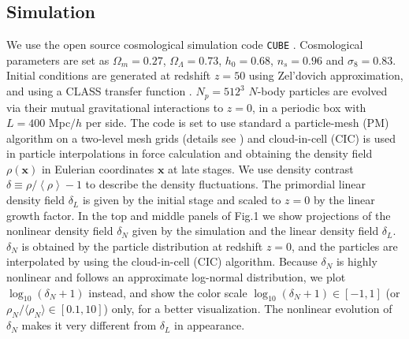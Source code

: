 \documentclass[aps,prd,twocolumn,superscriptaddress,amsfont,amssymb,amsmath,nofootinbib,showpacs,balancelastpage]{revtex4-1}
\newcommand{\bs}{\boldsymbol}
\newcommand{\lb}{\left\langle}
\newcommand{\rb}{\right\rangle}
\begin{document}
\subsection{Simulation}\label{ss.sim}
We use the open source cosmological simulation code {\tt CUBE} %
\citep{cafcube}.
Cosmological parameters are set as
$\Omega_m=0.27$, $\Omega_\Lambda=0.73$, $h_0=0.68$, $n_s=0.96$ and $\sigma_8=0.83$.
Initial conditions are generated at redshift $z=50$ 
using Zel'dovich approximation, and using a CLASS transfer function
\citep{2011JCAP...07..034B}.
$N_p=512^3$ $N$-body particles are evolved via 
their mutual gravitational interactions to $z=0$, in a periodic box with $L=400$ 
Mpc$/h$ per side. The code is set to use standard a particle-mesh (PM) algorithm 
\cite{1988csup.book.....H} on a two-level mesh grids
(details see \cite{2013MNRAS.436..540H}) and cloud-in-cell
(CIC) is used in particle interpolations in force 
calculation and obtaining the density field $\rho({\bs x})$ in Eulerian coordinates 
${\bs x}$ at late stages. We use density contrast $\delta\equiv\rho/\lb\rho\rb-1$ 
to describe the density fluctuations. The primordial linear density field $
\delta_L$ is given by the initial stage and scaled to $z=0$ by the linear growth 
factor. In the top and middle panels of Fig.1 we show projections of the nonlinear density field
$\delta_N$ given by the simulation and the linear density field $\delta_L$.
$\delta_N$ is obtained by the particle distribution at redshift $z=0$, and
the particles are interpolated by using the cloud-in-cell (CIC) algorithm.
Because $\delta_N$ is highly nonlinear and follows an approximate
log-normal distribution, we plot $\log_{10}(\delta_N+1)$ instead, and show
the color scale $\log_{10}(\delta_N+1)\in[-1,1]$ (or $\rho_N/\langle\rho_N\rangle\in[0.1,10]$)
only, for a better visualization.
The nonlinear evolution of $\delta_N$ makes it very different from $\delta_L$
in appearance.
\end{document}
